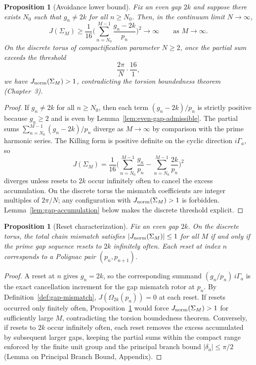 \documentclass[dvipdfmx,a4paper]{article}
\newtheorem{proposition}[theorem]{Proposition}
\theoremstyle{definition}
\theoremstyle{remark}
\newcommand{\Jnorm}{J_{\rm norm}}
\begin{document}
\begin{proposition}[Avoidance lower bound]
\label{prop:gap-avoidance}
Fix an even gap \( 2k \) and suppose there exists \( N_0 \) such that \( g_n \neq 2k \) for all \( n \geq N_0 \). Then, in the continuum limit \( N \to \infty \),
\[
J(\Sigma_M) \geq \frac{1}{16} \Biggl( \sum_{n=N_0}^{M-1} \frac{g_n - 2k}{p_n} \Biggr)^2 \to \infty \qquad \text{as } M \to \infty.
\]
On the discrete torus of compactification parameter \( N \geq 2 \), once the partial sum exceeds the threshold
\[
\frac{2\pi}{N} \cdot \frac{16}{1},
\]
we have \( \Jnorm(\Sigma_M) > 1 \), contradicting the torsion boundedness theorem (Chapter~3).
\end{proposition}

\begin{proof}
If \( g_n \neq 2k \) for all \( n \geq N_0 \), then each term \( (g_n - 2k)/p_n \) is strictly positive because \( g_n \geq 2 \) and is even by Lemma~\ref{lem:even-gap-admissible}. The partial sums \( \sum_{n=N_0}^{M-1} (g_n - 2k)/p_n \) diverge as \( M \to \infty \) by comparison with the prime harmonic series. The Killing form is positive definite on the cyclic direction \( i\Gamma_a \), so
\[
J(\Sigma_M) = \frac{1}{16} \Biggl( \sum_{n=N_0}^{M-1} \frac{g_n}{p_n} - \sum_{n=N_0}^{M-1} \frac{2k}{p_n} \Biggr)^2
\]
diverges unless resets to \( 2k \) occur infinitely often to cancel the excess accumulation. On the discrete torus the mismatch coefficients are integer multiples of \( 2\pi/N \); any configuration with \( \Jnorm(\Sigma_M) > 1 \) is forbidden. Lemma~\ref{lem:gap-accumulation} below makes the discrete threshold explicit.
\end{proof}

\begin{proposition}[Reset characterization]
\label{prop:gap-reset}
Fix an even gap \( 2k \). On the discrete torus, the total chain mismatch satisfies \( |\Jnorm(\Sigma_M)| \leq 1 \) for all \( M \) if and only if the prime gap sequence resets to \( 2k \) infinitely often. Each reset at index \( n \) corresponds to a Polignac pair \( (p_n, p_{n+1}) \).
\end{proposition}

\begin{proof}
A reset at \( n \) gives \( g_n = 2k \), so the corresponding summand \( (g_n/p_n)\, i\Gamma_a \) is the exact cancellation increment for the gap mismatch rotor at \( p_n \). By Definition~\ref{def:gap-mismatch}, \( J(\Omega_{2k}(p_n)) = 0 \) at each reset. If resets occurred only finitely often, Proposition~\ref{prop:gap-avoidance} would force \( \Jnorm(\Sigma_M) > 1 \) for sufficiently large \( M \), contradicting the torsion boundedness theorem. Conversely, if resets to \( 2k \) occur infinitely often, each reset removes the excess accumulated by subsequent larger gaps, keeping the partial sums within the compact range enforced by the finite unit group and the principal branch bound \( |\delta_a| \leq \pi/2 \) (Lemma on Principal Branch Bound, Appendix).
\end{proof}
\end{document}
